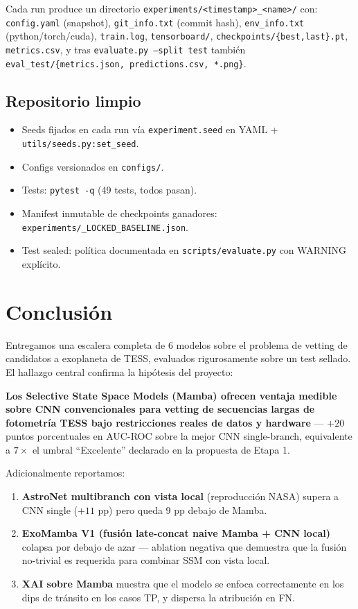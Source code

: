\documentclass[11pt, a4paper]{article}
\begin{document}
Cada run produce un directorio \texttt{experiments/<timestamp>\_<name>/} con: \texttt{config.yaml} (snapshot), \texttt{git\_info.txt} (commit hash), \texttt{env\_info.txt} (python/torch/cuda), \texttt{train.log}, \texttt{tensorboard/}, \texttt{checkpoints/\{best,last\}.pt}, \texttt{metrics.csv}, y tras \texttt{evaluate.py --split test} también \texttt{eval\_test/\{metrics.json, predictions.csv, *.png\}}.

\subsection{Repositorio limpio}

\begin{itemize}[leftmargin=*, topsep=0pt]
    \item Seeds fijados en cada run vía \texttt{experiment.seed} en YAML + \texttt{utils/seeds.py:set\_seed}.
    \item Configs versionados en \texttt{configs/}.
    \item Tests: \texttt{pytest -q} (49 tests, todos pasan).
    \item Manifest inmutable de checkpoints ganadores: \texttt{experiments/\_LOCKED\_BASELINE.json}.
    \item Test sealed: política documentada en \texttt{scripts/evaluate.py} con WARNING explícito.
\end{itemize}

\section{Conclusión}

Entregamos una escalera completa de 6 modelos sobre el problema de vetting de candidatos a exoplaneta de TESS, evaluados rigurosamente sobre un test sellado. El hallazgo central confirma la hipótesis del proyecto:

\begin{keybox}
\textbf{Los Selective State Space Models (Mamba) ofrecen ventaja medible sobre CNN convencionales para vetting de secuencias largas de fotometría TESS bajo restricciones reales de datos y hardware} --- $+20$ puntos porcentuales en AUC-ROC sobre la mejor CNN single-branch, equivalente a $7\times$ el umbral ``Excelente'' declarado en la propuesta de Etapa 1.
\end{keybox}

Adicionalmente reportamos:
\begin{enumerate}[leftmargin=*, topsep=0pt]
    \item \textbf{AstroNet multibranch con vista local} (reproducción NASA) supera a CNN single ($+11$ pp) pero queda 9 pp debajo de Mamba.
    \item \textbf{ExoMamba V1 (fusión late-concat naive Mamba + CNN local)} colapsa por debajo de azar --- ablation negativa que demuestra que la fusión no-trivial es requerida para combinar SSM con vista local.
    \item \textbf{XAI sobre Mamba} muestra que el modelo se enfoca correctamente en los dips de tránsito en los casos TP, y dispersa la atribución en FN.
\end{enumerate}
\end{document}
